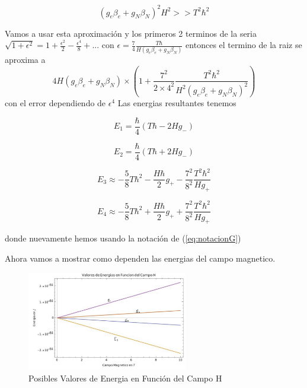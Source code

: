 \documentclass[twocolumn,
amssymb,prb,aps,superscriptaddress]{revtex4}
\begin{document}
\begin{equation}
    \label{eq:aproximacion}
    (g_e \beta_e + g_N \beta_N)^2 H^2 >> T^2 \hbar^2    
\end{equation}

 Vamos a usar esta aproximación y los primeros 2 terminos de la seria $ \sqrt{1 + \epsilon^2} = 1+\frac{\epsilon^2}{2}-\frac{\epsilon^4}{8} + ... $ con $ \epsilon = \frac{7}{4}\frac{T \hbar}{H(g_e \beta_e + g_N \beta_N)} $ entonces el termino de la raiz se aproxima a
$$ 4 H (g_e \beta_e + g_N \beta_N) \times \left(1 + \frac{7^2}{2 \times 4^2} \frac{T^2 \hbar^2}{H^2(g_e \beta_e + g_N \beta_N)^2} \right) $$ 
con el error dependiendo de $\epsilon^4$
Las energias resultantes tenemos

\begin{equation}
    \label{eq:energia1}
    E_1 = \frac{\hbar}{4}(T \hbar - 2 H g_-)
\end{equation}

\begin{equation}
    \label{eq:energia2}
    E_2 = \frac{\hbar}{4}(T \hbar + 2 H g_-)
\end{equation}

\begin{equation}
    \label{eq:energia3}
    E_3 \approx -\frac{5}{8} T \hbar^2 - \frac{H \hbar}{2} g_+ - \frac{7^2}{8^2} \frac{T^2 \hbar^2}{Hg_+}
\end{equation}

\begin{equation}
    \label{eq:energia4}
    E_4 \approx -\frac{5}{8} T \hbar^2 + \frac{H \hbar}{2} g_+ + \frac{7^2}{8^2} \frac{T^2 \hbar^2}{Hg_+}
\end{equation}

donde nuevamente hemos usando la notación de (\ref{eq:notacionG})

Ahora vamos a mostrar como dependen las energias del campo magnetico. 


    \begin{figure}[H]
        \centering
        \includegraphics[width=7cm]{images/GraficoEnergiasCamp.jpg}
        \caption{Posibles Valores de Energia en Función del Campo H}
        \label{fig:diagramaDeEnergia}
    \end{figure}
\end{document}
